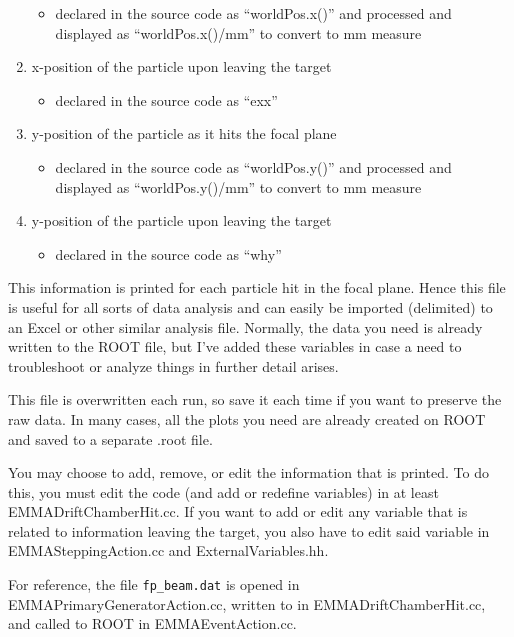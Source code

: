 \documentclass{article}
\begin{document}
\begin{enumerate}
\begin{itemize}
		\item declared in the source code as ``worldPos.x()'' and processed and 		displayed as ``worldPos.x()/mm'' to convert to mm measure
	\end{itemize}
	\item x-position of the particle upon leaving the target
	\begin{itemize}
		\item declared in the source code as ``exx''
	\end{itemize}
	\item y-position of the particle as it hits the focal plane
	\begin{itemize}
		\item declared in the source code as ``worldPos.y()'' and processed and 		displayed as ``worldPos.y()/mm'' to convert to mm measure
	\end{itemize}
	\item y-position of the particle upon leaving the target
	\begin{itemize}
		\item declared in the source code as ``why''
	\end{itemize}
	
\end{enumerate}

This information is printed for each particle hit in the focal plane. Hence this file is useful for all sorts of data analysis and can easily be imported (delimited) to an Excel or other similar analysis file. Normally, the data you need is already written to the ROOT file, but I've added these variables in case a need to troubleshoot or analyze things in further detail arises. 

This file is overwritten each run, so save it each time if you want to preserve the raw data. In many cases, all the plots you need are already created on ROOT and saved to a separate .root file. 

You may choose to add, remove, or edit the information that is printed. To do this, you must edit the code (and add or redefine variables) in at least EMMADriftChamberHit.cc. If you want to add or edit any variable that is related to information leaving the target, you also have to edit said variable in EMMASteppingAction.cc and ExternalVariables.hh. 

For reference, the file \texttt{fp\_beam.dat} is opened in EMMAPrimaryGeneratorAction.cc, written to in EMMADriftChamberHit.cc, and called to ROOT in EMMAEventAction.cc. 
\end{document}
